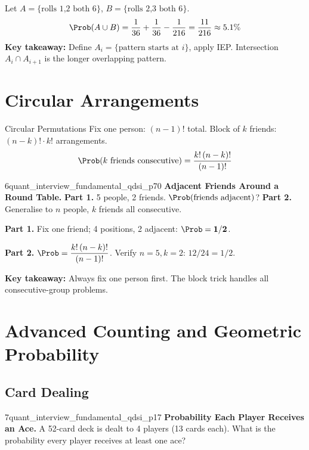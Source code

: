 \documentclass[11pt]{article}
\begin{document}
\begin{solutionbox}
Let $A=\{\text{rolls 1,2 both 6}\}$, $B=\{\text{rolls 2,3 both 6}\}$.
\[
  \Prob(A\cup B)=\frac{1}{36}+\frac{1}{36}-\frac{1}{216}=\frac{11}{216}\approx5.1\%
\]
\textbf{Key takeaway:} Define $A_i=\{\text{pattern starts at }i\}$, apply IEP.
Intersection $A_i\cap A_{i+1}$ is the longer overlapping pattern.
\end{solutionbox}

\section{Circular Arrangements}

\begin{conceptbox}{Circular Permutations}
Fix one person: $(n-1)!$ total. Block of $k$ friends: $(n-k)!\cdot k!$ arrangements.
\[
  \Prob(\text{$k$ friends consecutive}) = \frac{k!\,(n-k)!}{(n-1)!}
\]
\end{conceptbox}

\begin{freeproblem}{6}{\freelabel}{}{quant\_interview\_fundamental\_qdsi\_p70}
\textbf{Adjacent Friends Around a Round Table.}
\textbf{Part 1.} 5 people, 2 friends. $\Prob(\text{friends adjacent})$?
\textbf{Part 2.} Generalise to $n$ people, $k$ friends all consecutive.
\end{freeproblem}

\begin{solutionbox}
\textbf{Part 1.} Fix one friend; 4 positions, 2 adjacent: $\Prob=\mathbf{1/2}$.

\textbf{Part 2.}
$\Prob = \dfrac{k!\,(n-k)!}{(n-1)!}$. Verify $n=5, k=2$: $12/24=1/2$. \checkmark

\textbf{Key takeaway:} Always fix one person first. The block trick handles all
consecutive-group problems.
\end{solutionbox}

\section{Advanced Counting and Geometric Probability}

\subsection{Card Dealing}

\begin{premiumproblem}{7}{\premiumlabel}{}{quant\_interview\_fundamental\_qdsi\_p17}
\textbf{Probability Each Player Receives an Ace.}
A 52-card deck is dealt to 4 players (13 cards each). What is the probability every
player receives at least one ace?
\end{premiumproblem}
\end{document}
